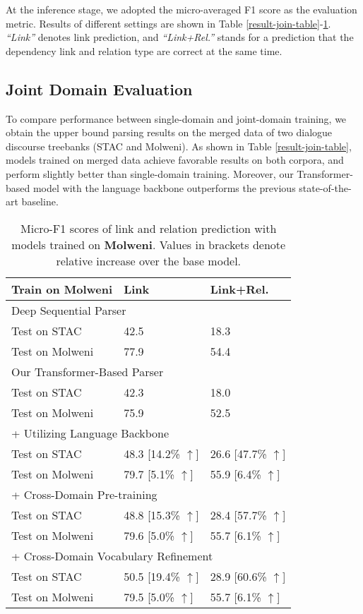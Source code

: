 \documentclass[11pt]{article}
\begin{document}
At the inference stage, we adopted the micro-averaged F1 score as the evaluation metric. Results of different settings are shown in Table \ref{result-join-table}-\ref{result-mol-table}. \textit{``Link''} denotes link prediction, and \textit{``Link+Rel.''} stands for a prediction that the dependency link and relation type are correct at the same time.

\subsection{Joint Domain Evaluation}
To compare performance between single-domain and joint-domain training, we obtain the upper bound parsing results on the merged data of two dialogue discourse treebanks (STAC and Molweni). As shown in Table \ref{result-join-table}, models trained on merged data achieve favorable results on both corpora, and perform slightly better than single-domain training. Moreover, our Transformer-based model with the language backbone outperforms the previous state-of-the-art baseline.

\begin{table}[t!]
\linespread{1.0}
\centering
\small
\begin{tabular}{p{2.6cm}p{1.9cm}<{\centering}p{1.9cm}<{\centering}}
\toprule
\textbf{Train on Molweni}  & \textbf{Link} & \textbf{Link+Rel.} \\
\midrule
\multicolumn{3}{l}{Deep Sequential Parser \cite{shi2019deepSeqParser}} \\
Test on STAC & 42.5 & 18.3 \\
Test on Molweni & 77.9 & 54.4 \\
\midrule
\midrule
\multicolumn{3}{l}{Our Transformer-Based Parser} \\
Test on STAC & 42.3 & 18.0 \\
Test on Molweni & 75.9 & 52.5 \\
\midrule
\multicolumn{3}{l}{+ Utilizing Language Backbone} \\
Test on STAC & 48.3 [14.2\% $\uparrow$] & 26.6 [47.7\% $\uparrow$] \\
Test on Molweni & 79.7 [5.1\% $\uparrow$] & 55.9 [6.4\% $\uparrow$] \\
\midrule
\multicolumn{3}{l}{+ Cross-Domain Pre-training} \\
Test on STAC & 48.8 [15.3\% $\uparrow$] & 28.4 [57.7\% $\uparrow$] \\
Test on Molweni & 79.6 [5.0\% $\uparrow$] & 55.7 [6.1\% $\uparrow$] \\
\midrule
\multicolumn{3}{l}{+ Cross-Domain Vocabulary Refinement} \\
Test on STAC & 50.5 [19.4\% $\uparrow$] & 28.9 [60.6\% $\uparrow$] \\
Test on Molweni & 79.5 [5.0\% $\uparrow$] &  55.7 [6.1\% $\uparrow$] \\
\bottomrule
\end{tabular}
\caption{\label{result-mol-table} Micro-F1 scores of link and relation prediction with models trained on \textbf{Molweni}. Values in brackets denote relative increase over the base model.}
\vspace{-0.2cm}
\end{table}
\end{document}
